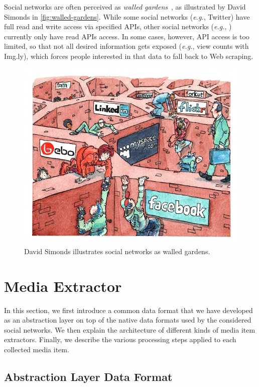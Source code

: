 Social networks are often perceived as
\emph{walled gardens}~\cite{simonds2008walledgarden},
as illustrated by David Simonds in \autoref{fig:walled-gardens}.
While some social networks (\emph{e.g.}, Twitter)
have full read and write access via specified APIs,
other social networks (\emph{e.g.}, \googleplus)
currently only have read APIs access.
In some cases, however, API access is too limited,
so that not all desired information gets exposed
(\emph{e.g.}, view counts with Img.ly),
which forces people interested in that data
to fall back to Web scraping.

\begin{figure}[h!]
  \centering
  \includegraphics[width=0.7\linewidth,
    trim=16px 17px 12px 15px,clip]{davidsimonds.jpg}
  \caption[David Simonds illustrates social networks as walled
    gardens.]
    {David Simonds illustrates social networks as walled
    gardens.}
  \label{fig:walled-gardens}
\end{figure}

\section{Media Extractor}
\label{sec:media-extractor}

In this section, we first introduce a common data format
that we have developed as an abstraction layer on top of the native
data formats used by the considered social networks.
We then explain the architecture
of different kinds of media item extractors.
Finally, we describe the various processing steps
applied to each collected media item.

\subsection{Abstraction Layer Data Format}
\label{sec:data-format}

